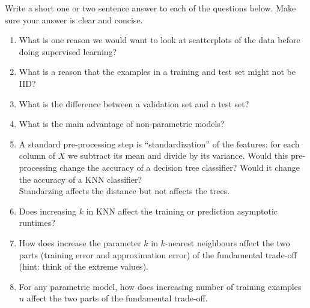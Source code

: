 \documentclass{article}
\def\blu#1{{\color{blu}#1}}
\def\enum#1{\begin{enumerate}#1\end{enumerate}}
\begin{document}
\blu{Write a short one or two sentence answer to each of the questions below}. Make sure your answer is clear and concise.

\enum{
\item What is one reason we would want to look at scatterplots of the data before doing supervised learning?
\item What is a reason that the examples in a training and test set might not be IID?
\item What is the difference between a validation set and a test set?
\item What is the main advantage of non-parametric models?
\item A standard pre-processing step is ``standardization'' of the features: for each column of $X$ we subtract its mean and divide by its variance. Would this pre-processing change the accuracy of a decision tree classifier? Would it change the accuracy of a KNN classifier?\\
Standarzing affects the distance but not affects the trees.
\item Does increasing $k$ in KNN affect the training or prediction asymptotic runtimes?
\\
\item How does increase the parameter $k$ in $k$-nearest neighbours affect the two parts (training error and approximation error) of the fundamental trade-off (hint: think of the extreme values).
\item For any parametric model, how does increasing number of training examples $n$ affect the two parts of the fundamental trade-off.
}
\end{document}
